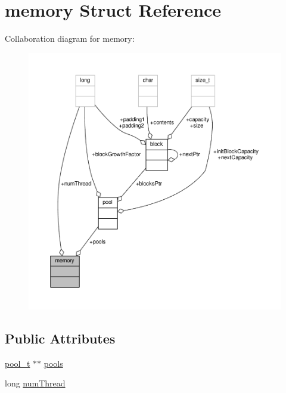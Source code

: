 \hypertarget{structmemory}{\section{memory Struct Reference}
\label{structmemory}
}


Collaboration diagram for memory\-:
\nopagebreak
\begin{figure}[H]
\begin{center}
\leavevmode
\includegraphics[width=350pt]{structmemory__coll__graph}
\end{center}
\end{figure}
\subsection*{Public Attributes}
\begin{DoxyCompactItemize}
\item 
\hyperlink{memory_8c_af40f12257d45268f5e068e7b117ae302}{pool\-\_\-t} $\ast$$\ast$ \hyperlink{structmemory_ae6373eeee48d33f4b92cef542c2adf90}{pools}
\item 
long \hyperlink{structmemory_abefc048307c14ed9c9dea0f0f11307df}{num\-Thread}
\end{DoxyCompactItemize}


